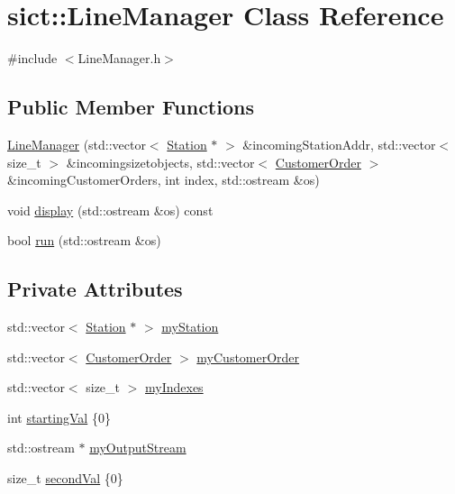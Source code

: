 \hypertarget{classsict_1_1LineManager}{}\section{sict\+::Line\+Manager Class Reference}
\label{classsict_1_1LineManager}


{\ttfamily \#include $<$Line\+Manager.\+h$>$}

\subsection*{Public Member Functions}
\begin{DoxyCompactItemize}
\item 
\mbox{\hyperlink{classsict_1_1LineManager_a63839df687765c8c083a9e38265b71ab}{Line\+Manager}} (std\+::vector$<$ \mbox{\hyperlink{classsict_1_1Station}{Station}} $\ast$ $>$ \&incoming\+Station\+Addr, std\+::vector$<$ size\+\_\+t $>$ \&incomingsizetobjects, std\+::vector$<$ \mbox{\hyperlink{classsict_1_1CustomerOrder}{Customer\+Order}} $>$ \&incoming\+Customer\+Orders, int index, std\+::ostream \&os)
\item 
void \mbox{\hyperlink{classsict_1_1LineManager_ad4d40fef3cc77b5890654f95cf90b595}{display}} (std\+::ostream \&os) const
\item 
bool \mbox{\hyperlink{classsict_1_1LineManager_ae50b0c9cc0130ddcf0435ff9b9b2a919}{run}} (std\+::ostream \&os)
\end{DoxyCompactItemize}
\subsection*{Private Attributes}
\begin{DoxyCompactItemize}
\item 
std\+::vector$<$ \mbox{\hyperlink{classsict_1_1Station}{Station}} $\ast$ $>$ \mbox{\hyperlink{classsict_1_1LineManager_ae082231b024e726fa5185553fc27eefc}{my\+Station}}
\item 
std\+::vector$<$ \mbox{\hyperlink{classsict_1_1CustomerOrder}{Customer\+Order}} $>$ \mbox{\hyperlink{classsict_1_1LineManager_a537ba2999ee2503a59f45af3d6480c77}{my\+Customer\+Order}}
\item 
std\+::vector$<$ size\+\_\+t $>$ \mbox{\hyperlink{classsict_1_1LineManager_a6f84418974d3916ed2dd6785ced4d865}{my\+Indexes}}
\item 
int \mbox{\hyperlink{classsict_1_1LineManager_a117d40e5cf7ee1a89b163b2bcf555ed6}{starting\+Val}} \{0\}
\item 
std\+::ostream $\ast$ \mbox{\hyperlink{classsict_1_1LineManager_a5aa1aa1aa5ef3f8208eee1f6ae0f1487}{my\+Output\+Stream}}
\item 
size\+\_\+t \mbox{\hyperlink{classsict_1_1LineManager_ab960db31b3db6786a14b56927168d92b}{second\+Val}} \{0\}
\end{DoxyCompactItemize}


